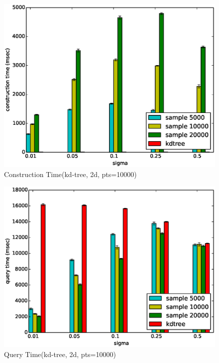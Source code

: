 \documentclass[mcs]{scsthesis}
\begin{document}
\begin{figure}
\begin{center}
\includegraphics[scale=0.5]{diagrams/kt_2d_pts10000_groupbysample_ctime.eps}
\caption{Construction Time(kd-tree, 2d, pts=10000)}
\label{fig:sample_set_size_ctime}
\end{center}
\end{figure}

\begin{figure}
\begin{center}
\includegraphics[scale=0.5]{diagrams/kt_2d_pts10000_groupbysample_qtime.eps}
\caption{Query Time(kd-tree, 2d, pts=10000)}
\label{fig:sample_set_size_qtime}
\end{center}
\end{figure}
\end{document}
